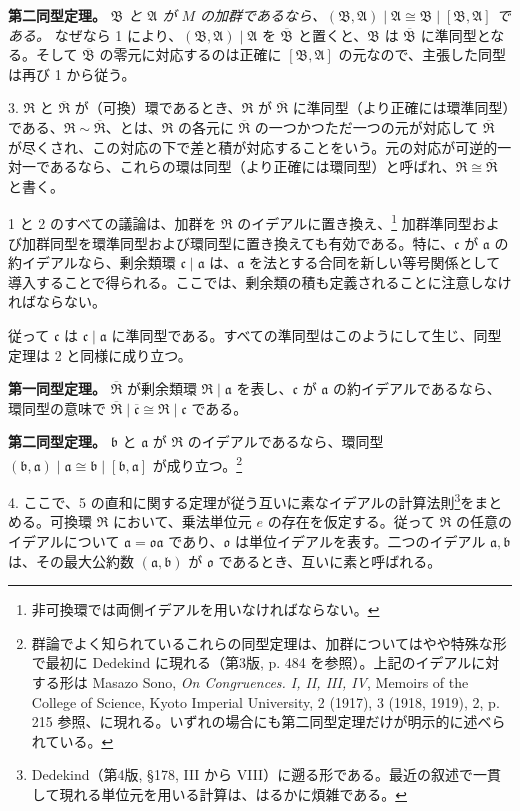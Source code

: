\documentclass[11pt]{article}
\providecommand{\mR}{\mathfrak{R}}
\providecommand{\mA}{\mathfrak{A}}
\providecommand{\mB}{\mathfrak{B}}
\providecommand{\ma}{\mathfrak{a}}
\providecommand{\mb}{\mathfrak{b}}
\providecommand{\mc}{\mathfrak{c}}
\providecommand{\mo}{\mathfrak{o}}
\begin{document}
\textbf{第二同型定理。} \emph{$\mB$ と $\mA$ が $M$ の加群であるなら、$(\mB,\mA)\mid\mA\cong\mB\mid[\mB,\mA]$ である。} なぜなら 1 により、$(\mB,\mA)\mid\mA$ を $\overline{\mB}$ と置くと、$\mB$ は $\overline{\mB}$ に準同型となる。そして $\overline{\mB}$ の零元に対応するのは正確に $[\mB,\mA]$ の元なので、主張した同型は再び 1 から従う。

3. $\mR$ と $\overline{\mR}$ が（可換）環であるとき、$\mR$ が $\overline{\mR}$ に準同型（より正確には環準同型）である、$\mR\sim\overline{\mR}$、とは、$\mR$ の各元に $\overline{\mR}$ の一つかつただ一つの元が対応して $\overline{\mR}$ が尽くされ、この対応の下で差と積が対応することをいう。元の対応が可逆的一対一であるなら、これらの環は同型（より正確には環同型）と呼ばれ、$\mR\cong\overline{\mR}$ と書く。

1 と 2 のすべての議論は、加群を $\mR$ のイデアルに置き換え、\footnote{非可換環では両側イデアルを用いなければならない。} 加群準同型および加群同型を環準同型および環同型に置き換えても有効である。特に、$\mc$ が $\ma$ の約イデアルなら、剰余類環 $\mc\mid\ma$ は、$\ma$ を法とする合同を新しい等号関係として導入することで得られる。ここでは、剰余類の積も定義されることに注意しなければならない。

従って $\mc$ は $\mc\mid\ma$ に準同型である。すべての準同型はこのようにして生じ、同型定理は 2 と同様に成り立つ。

\textbf{第一同型定理。} $\overline{\mR}$ が剰余類環 $\mR\mid\ma$ を表し、$\mc$ が $\ma$ の約イデアルであるなら、環同型の意味で $\overline{\mR}\mid\overline{\mc}\cong\mR\mid\mc$ である。

\textbf{第二同型定理。} $\mb$ と $\ma$ が $\mR$ のイデアルであるなら、環同型 $(\mb,\ma)\mid\ma\cong\mb\mid[\mb,\ma]$ が成り立つ。\footnote{群論でよく知られているこれらの同型定理は、加群についてはやや特殊な形で最初に Dedekind に現れる（第3版, p. 484 を参照）。上記のイデアルに対する形は Masazo Sono, \emph{On Congruences. I, II, III, IV}, Memoirs of the College of Science, Kyoto Imperial University, 2 (1917), 3 (1918, 1919), 2, p. 215 参照、に現れる。いずれの場合にも第二同型定理だけが明示的に述べられている。}

4. ここで、5 の直和に関する定理が従う互いに素なイデアルの計算法則\footnote{Dedekind（第4版, §178, III から VIII）に遡る形である。最近の叙述で一貫して現れる単位元を用いる計算は、はるかに煩雑である。}をまとめる。可換環 $\mR$ において、乗法単位元 $e$ の存在を仮定する。従って $\mR$ の任意のイデアルについて $\ma=\mo\ma$ であり、$\mo$ は単位イデアルを表す。二つのイデアル $\ma,\mb$ は、その最大公約数 $(\ma,\mb)$ が $\mo$ であるとき、互いに素と呼ばれる。
\end{document}
